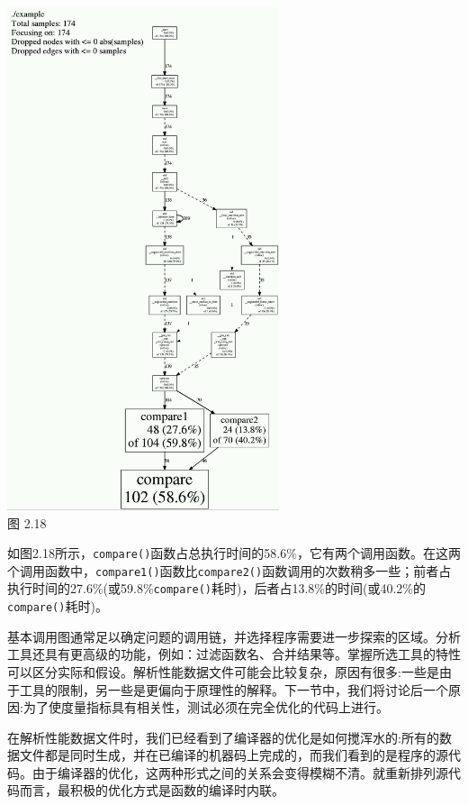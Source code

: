 \begin{center}
\includegraphics[width=0.6\textwidth]{content/1/chapter2/images/18.jpg}\\
图 2.18
\end{center}

如图2.18所示，\texttt{compare()}函数占总执行时间的58.6\%，它有两个调用函数。在这两个调用函数中，\texttt{compare1()}函数比\texttt{compare2()}函数调用的次数稍多一些；前者占执行时间的27.6\%(或59.8\%\texttt{compare()}耗时)，后者占13.8\%的时间(或40.2\%的\texttt{compare()}耗时)。

基本调用图通常足以确定问题的调用链，并选择程序需要进一步探索的区域。分析工具还具有更高级的功能，例如：过滤函数名、合并结果等。掌握所选工具的特性可以区分实际和假设。解析性能数据文件可能会比较复杂，原因有很多:一些是由于工具的限制，另一些是更偏向于原理性的解释。下一节中，我们将讨论后一个原因:为了使度量指标具有相关性，测试必须在完全优化的代码上进行。


在解析性能数据文件时，我们已经看到了编译器的优化是如何搅浑水的:所有的数据文件都是同时生成，并在已编译的机器码上完成的，而我们看到的是程序的源代码。由于编译器的优化，这两种形式之间的关系会变得模糊不清。就重新排列源代码而言，最积极的优化方式是函数的编译时内联。


